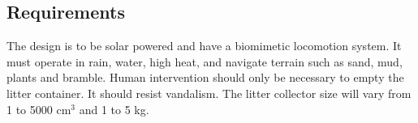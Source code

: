 \subsection{Requirements}

The design is to be solar powered and have a biomimetic locomotion system.
It must operate in rain, water, high heat, and navigate terrain such as sand, mud, plants and bramble.
Human intervention should only be necessary to empty the litter container.
It should resist vandalism.
The litter collector size will vary from 1 to 5000 cm$^3$ and 1 to 5 kg.